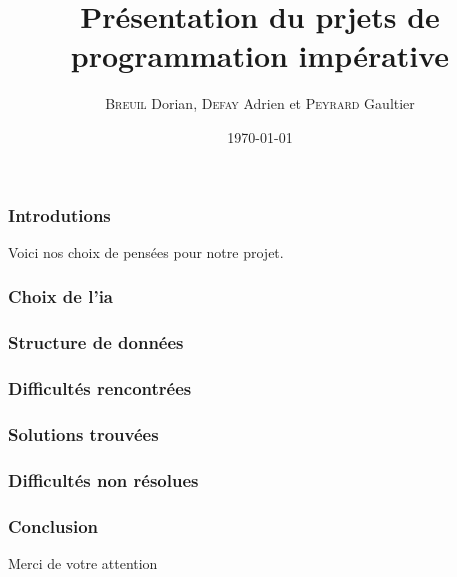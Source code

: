 \documentclass{beamer}
\title{Présentation du prjets de programmation impérative}
\author{\textsc{Breuil} Dorian, \textsc{Defay} Adrien et \textsc{Peyrard} Gaultier}
\date{\today}
\begin{document}
\frame{\titlepage}  %

\begin{frame}
  \frametitle{Introdutions}  %
  Voici nos choix de pensées pour notre projet.
\end{frame}

\begin{frame}
  \frametitle{Choix de l'ia}  %
  
\end{frame}

\begin{frame}
  \frametitle{Structure de données}
\end{frame}

\begin{frame}
  \frametitle{Difficultés rencontrées}
\end{frame}

\begin{frame}
  \frametitle{Solutions trouvées}
\end{frame}

\begin{frame}
  \frametitle{Difficultés non résolues}
\end{frame}

\begin{frame}
  \frametitle{Conclusion}
  Merci de votre attention
\end{frame}
\end{document}
